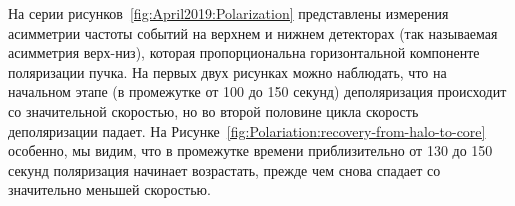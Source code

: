 На серии рисунков~\ref{fig:April2019:Polarization} представлены измерения асимметрии частоты событий на верхнем и нижнем детекторах (так называемая асимметрия верх-низ), которая пропорциональна горизонтальной компоненте поляризации пучка. На первых двух рисунках можно наблюдать, что на начальном этапе (в промежутке от 100 до 150 секунд) деполяризация происходит со значительной скоростью, но во второй половине цикла скорость деполяризации падает. На Рисунке~\ref{fig:Polariation:recovery-from-halo-to-core} особенно, мы видим, что в промежутке времени приблизительно от 130 до 150 секунд поляризация начинает возрастать, прежде чем снова спадает со значительно меньшей скоростью.
\begin{figure}[H]\centering
\end{figure}
\begin{figure}[H]\centering
\end{figure}

